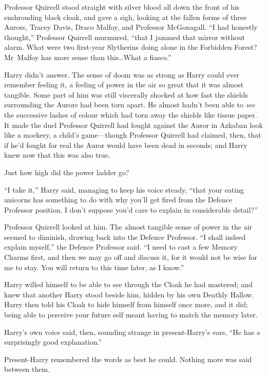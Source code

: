 Professor Quirrell stood straight with silver blood all down the front of his enshrouding black cloak, and gave a sigh, looking at the fallen forms of three Aurors, Tracey Davis, Draco Malfoy, and Professor McGonagall. “I had honestly thought,” Professor Quirrell murmured, “that I jammed that mirror without alarm. What were two first-year Slytherins doing alone in the Forbidden Forest? Mr~Malfoy has more sense than this…What a fiasco.”

Harry didn’t answer. The sense of doom was as strong as Harry could ever remember feeling it, a feeling of power in the air so great that it was almost tangible. Some part of him was still viscerally shocked at how fast the shields surrounding the Aurors had been torn apart. He almost hadn’t been able to \emph{see} the successive lashes of colour which had torn away the shields like tissue paper. It made the duel Professor Quirrell had fought against the Auror in Azkaban look like a mockery, a child’s game—though Professor Quirrell had claimed, then, that if he’d fought for real the Auror would have been dead in seconds; and Harry knew now that this was also true.

Just how high did the power ladder go?

“I take it,” Harry said, managing to keep his voice steady, “that your eating unicorns has something to do with why you’ll get fired from the Defence Professor position. I don’t suppose you’d care to explain in considerable detail?”

Professor Quirrell looked at him. The almost tangible sense of power in the air seemed to diminish, drawing back into the Defence Professor. “I shall indeed explain myself,” the Defence Professor said. “I need to cast a few Memory Charms first, and then we may go off and discuss it, for it would not be wise for me to stay. You will return to this time later, as I know.”

Harry willed himself to be able to see through the Cloak he had mastered; and knew that another Harry stood beside him, hidden by his own Deathly Hallow. Harry then told his Cloak to hide himself from himself once more, and it did; being able to perceive your future self meant having to match the memory later.

Harry’s own voice said, then, sounding strange in present-Harry’s ears, “He has a surprisingly good explanation.”

Present-Harry remembered the words as best he could. Nothing more was said between them.

